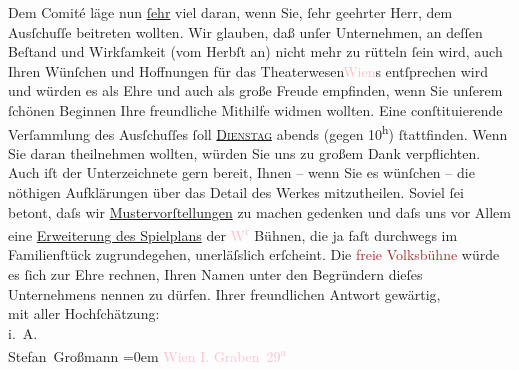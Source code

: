            \pstart
           Dem Comité läge nun \uline{ſehr} viel daran, wenn Sie, ſehr
               geehrter Herr, dem Ausſchuſſe beitreten wollten. Wir glauben, daß unſer Unternehmen,
               an deſſen Beſtand und Wirkſamkeit (vom Herbſt an) nicht mehr zu rütteln
               ſein wird, auch Ihren Wünſchen und Hoffnungen für das Theaterwesen\textcolor{pink}{Wien}{}\ledrightnote{\textcolor{pink}{Wien}}s entſprechen wird und würden es als Ehre und
               auch als große Freude empfinden, wenn Sie unſerem ſchönen Beginnen Ihre freundliche
               Mithilfe widmen wollten.\pend
           \pstart
           Eine conſtituierende Verſammlung des Ausſchuſſes ſoll \uline{\textsc{Dienstag}} abends (gegen 10\textsuperscript{h}) ſtattfinden. Wenn Sie daran
               theilnehmen wollten, würden Sie uns zu großem Dank verpflichten. Auch iſt der
               Unterzeichnete gern bereit, Ihnen {\pb}– wenn Sie
               es wünſchen – die nöthigen Aufklärungen über das Detail des Werkes mitzutheilen.
               Soviel ſei betont, daſs wir \uline{Mustervorſtellungen} zu
               machen gedenken und daſs uns vor Allem eine \uline{Erweiterung
                  des Spielplans} der \textcolor{pink}{W\textsuperscript{r}}{}\ledrightnote{\textcolor{pink}{Wien}} Bühnen, die ja faſt durchwegs im Familienſtück zugrundegehen, unerläſslich
               erſcheint.\pend
           \pstart
           Die \textcolor{brown}{freie Volksbühne}{}\ledrightnote{\textcolor{brown}{Wiener Freie Volksbühne}} würde es ſich zur Ehre rechnen,
               Ihren Namen unter den Begründern dieſes 
               Unternehmens nennen zu dürfen.\pend
           \pstart
           Ihrer freundlichen Antwort gewärtig, {\\[\baselineskip]}mit aller Hochſchätzung:{\\[\baselineskip]}i. A.{\\[\baselineskip]}\spacefill\mbox{Stefan Großmann}\pend
           \leftskip=0em{}\pstart
           \noindent{}\textcolor{pink}{Wien I. Graben 29\textsuperscript{a}}{}\ledrightnote{\textcolor{pink}{Graben}}\pend
           \endnumbering{}  
      